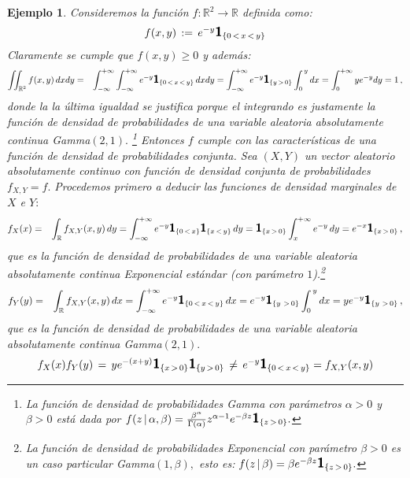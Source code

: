 \documentclass[spanish,10pt,letterpaper]{article}
\newtheorem{ejem}{Ejemplo}
\newcommand{\Runo}{\mathbb{R}}
\newcommand{\indic}{\textbf{\textsf{\large{1}}}}
\begin{document}
\begin{ejem}\label{ej:fdpbiv}
   Consideremos la función $f:\Runo^2\rightarrow\Runo$ definida como:
   $$f(x,y) \,:=\, e^{-y}\indic_{\{0\,<\,x\,<\,y\}}$$
   Claramente se cumple que $f(x,y)\geq 0$ y además:
   \begin{eqnarray*}
    \iint_{\Runo^2}f(x,y)\,dxdy &=& \int_{-\infty}^{+\infty}\int_{-\infty}^{+\infty}e^{-y}\indic_{\{0\,<\,x\,<\,y\}}\,dxdy = \int_{-\infty}^{+\infty}e^{-y}\indic_{\{y\,>\,0\}}\int_{0}^{\,y}dx = \int_{0}^{+\infty}ye^{-y}dy = 1\,,
   \end{eqnarray*}
   donde la la última igualdad se justifica porque el integrando es justamente la función de densidad de probabilidades de una variable aleatoria absolutamente continua Gamma$(2,1).$ \footnote{La función de densidad de probabilidades Gamma con parámetros $\alpha>0$ y $\beta>0$ está dada por $f(z\,|\,\alpha,\beta)=\frac{\beta^{\alpha}}{\Gamma(\alpha)}z^{\alpha-1}e^{-\beta z}\indic_{\{z\,>\,0\}}.$} Entonces $f$ cumple con las características de una función de densidad de probabilidades conjunta. Sea $(X,Y)$ un vector aleatorio absolutamente continuo con función de densidad conjunta de probabilidades $f_{X,Y}=f.$ Procedemos primero a deducir las funciones de densidad marginales de $X$ e $Y:$
   \begin{eqnarray*}
       f_X(x) &=& \int_{\Runo}f_{X,Y}(x,y)\,dy = \int_{-\infty}^{+\infty}e^{-y}\indic_{\{0\,<\,x\}}\indic_{\{x\,<\,y\}}\,dy = \indic_{\{x\,>\,0\}}\int_{x}^{+\infty}e^{-y}\,dy = e^{-x}\indic_{\{x\,>\,0\}}\,,
   \end{eqnarray*}
   que es la función de densidad de probabilidades de una variable aleatoria absolutamente continua Exponencial estándar (con parámetro $1$).\footnote{La función de densidad de probabilidades Exponencial con parámetro $\beta>0$ es un caso particular Gamma$(1,\beta),$ esto es: \linebreak $f(z\,|\,\beta)=\beta e^{-\beta z}\indic_{\{z\,>\,0\}}.$}
   \begin{eqnarray*}
       f_Y(y) &=& \int_{\Runo}f_{X,Y}(x,y)\,dx = \int_{-\infty}^{+\infty}e^{-y}\indic_{\{0\,<\,x\,<\,y\}}\,dx = e^{-y}\indic_{\{y\, \,>\,0\}}\int_{0}^{\,y}dx = ye^{-y}\indic_{\{y\, \,>\,0\}}\,,
   \end{eqnarray*}
   que es la función de densidad de probabilidades de una variable aleatoria absolutamente continua Gamma$(2,1).$
   $$f_X(x)f_Y(y) \,=\, ye^{-(x+y)}\indic_{\{x\,>\,0\}}\indic_{\{y\,>\,0\}} \,\neq\, e^{-y}\indic_{\{0\,<\,x\,<\,y\}} = f_{X,Y}(x,y)$$

\end{ejem}
\end{document}
